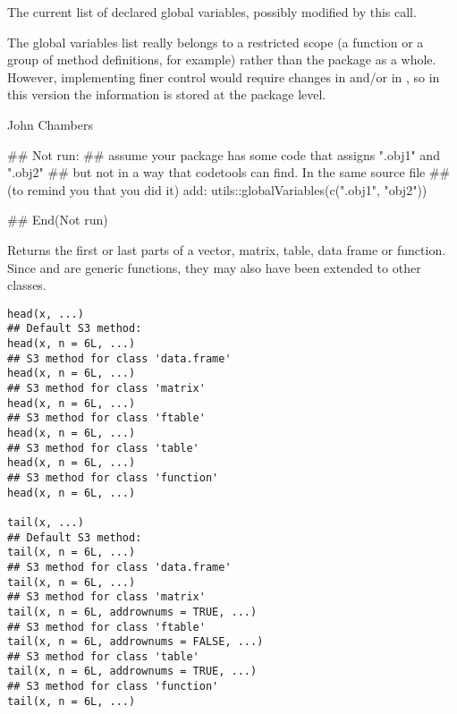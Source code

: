 %
\begin{Value}
The current list of declared global variables, possibly modified by
this call.
\end{Value}
%
\begin{Note}\relax
The global variables list really belongs to a restricted scope (a
function or a group of method definitions, for example) rather than the
package as a whole.  However, implementing finer control would require changes
in  and/or in , so in this version the
information is stored at the package level.
\end{Note}
%
\begin{Author}\relax
John Chambers
\end{Author}
%
\begin{Examples}
\begin{ExampleCode}
## Not run: 
## assume your package has some code that assigns ".obj1" and ".obj2"
## but not in a way that codetools can find.  In the same source file
## (to remind you that you did it) add:
utils::globalVariables(c(".obj1", "obj2"))

## End(Not run)
\end{ExampleCode}
\end{Examples}
%
\begin{Description}\relax
Returns the first or last parts of a vector, matrix, table, data frame
or function.  Since  and  are generic
functions, they may also have been extended to other classes.
\end{Description}
%
\begin{Usage}
\begin{verbatim}
head(x, ...)
## Default S3 method:
head(x, n = 6L, ...)
## S3 method for class 'data.frame'
head(x, n = 6L, ...)
## S3 method for class 'matrix'
head(x, n = 6L, ...)
## S3 method for class 'ftable'
head(x, n = 6L, ...)
## S3 method for class 'table'
head(x, n = 6L, ...)
## S3 method for class 'function'
head(x, n = 6L, ...)

tail(x, ...)
## Default S3 method:
tail(x, n = 6L, ...)
## S3 method for class 'data.frame'
tail(x, n = 6L, ...)
## S3 method for class 'matrix'
tail(x, n = 6L, addrownums = TRUE, ...)
## S3 method for class 'ftable'
tail(x, n = 6L, addrownums = FALSE, ...)
## S3 method for class 'table'
tail(x, n = 6L, addrownums = TRUE, ...)
## S3 method for class 'function'
tail(x, n = 6L, ...)
\end{verbatim}
\end{Usage}
